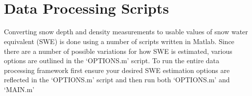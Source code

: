 \documentclass{sfuthesis}
\begin{document}
\begin{appendices}
\\
\\


\chapter{Data Processing Scripts}

Converting snow depth and density measurements to usable values of snow water equivalent (SWE) is done using a number of scripts written in Matlab. Since there are a number of possible variations for how SWE is estimated, various options are outlined in the `OPTIONS.m' script. To run the entire data processing framework first ensure your desired SWE estimation options are reflected in the `OPTIONS.m' script and then run both `OPTIONS.m' and `MAIN.m'


\end{appendices}
\end{document}
